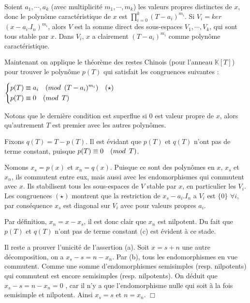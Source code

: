 \documentclass[a4paper,openany,12pt]{report}
\newcommand{\KK}{\mathbb{K}}
\theoremstyle{break}
{\theorembodyfont{\upshape}
\newtheorem*{rmq}{Remarque :}
\newtheorem*{prv}{Preuve :}
\newtheorem*{ex}{Exemples :}
\newtheorem*{exe}{Exemple : }
\newtheorem*{nota}{Notation :}
\newtheorem*{dem}{D\'emonstration :}}
\begin{document}
\begin{prv}
\quad Soient $a_{1},\cdots,a_{k}$ (avec multiplicité $m_{1},\cdots,m_{k}$) les valeurs propres distinctes de $x$, donc le polynôme caractéristique de $x$ est $\prod\limits_{i=0}^k  \left( T-a_{i} \right)^{m_{i}}$. Si $V_{i}=ker$ $(x-a_{i}.I_{n})^{m_{i}}$, alors $V$ est la somme direct des sous-espaces $V_{1}, \cdots, V_{k}$, qui sont tous stable par $x$. Dans $V_{i}$, $x$ a clairement $(T-a_{i})^{m_{i}}$ comme polynôme caractéristique.

Maintenant on applique le théorème des restes Chinois (pour l'anneau $\KK [T]$) pour trouver le polynôme $p(T)$ qui satisfait les congruences suivantes :
\begin{center}
$
\left\{
\begin{aligned}
p(T) & \equiv a_{i} \quad (mod \enskip (T-a_{i})^{m_{i}}) \quad (\star) \\
p(T) & \equiv 0 \quad (mod \enskip T)
\end{aligned}
\right. $
\end{center}

Notons que le dernière condition est superflue si $0$ est valeur propre de $x$, alors qu'autrement $T$ est premier avec les autres polynômes. 

Fixons $q(T)=T-p(T)$. Il est évidant que $p(T)$ et $q(T)$ n'ont pas de terme constant, puisque $p(T) \equiv 0 \quad (mod \enskip T)$.

Nomons $x_{s} = p(x)$ et $x_{n} = q(x)$. Puisque ce sont des polynômes en $x$, $x_{s}$ et $x_{n}$, ils commutent entre eux, mais aussi avec les endomorphismes qui commutent avec $x$. Ils stabilisent tous les sous-espaces de $V$ stable par $x$, en particulier les $V_{i}$. Les congruences $(\star)$ montrent que la restriction de $x_{s}-a_{i}.I_{n}$ a $V_{i}$ est $\{0\}$ $\forall i$, par conséquence $x_{s}$ est diagonal sur $V_{i}$ avec pour valeurs propres $a_{i}$.

Par définition, $x_{n} = x - x_{s}$, il est donc clair que $x_{n}$ est nilpotent. Du fait que $p(T)$ et $q(T)$ n'ont pas de terme constant (c) est évident à ce stade. 

Il reste a prouver l'unicité de l'assertion (a). Soit $x=s+n$ une autre décomposition, on a $x_{s}-s=n-x_{n}$. Par (b), tous les endomorphismes en vue commutent. Comme une somme d'endomorphismes semisimples (resp. nilpotents) qui commutent est encore semisimples (resp. nilpotents). On déduit que $x_{s}-s=n-x_{n}=0$ , car il n'y a que l'endomorphisme nulle qui soit à la fois semisimple et nilpotent. Ainsi $x_{s}=s$ et $n =x_{n}$. $\Box$
\end{prv}
\end{document}
